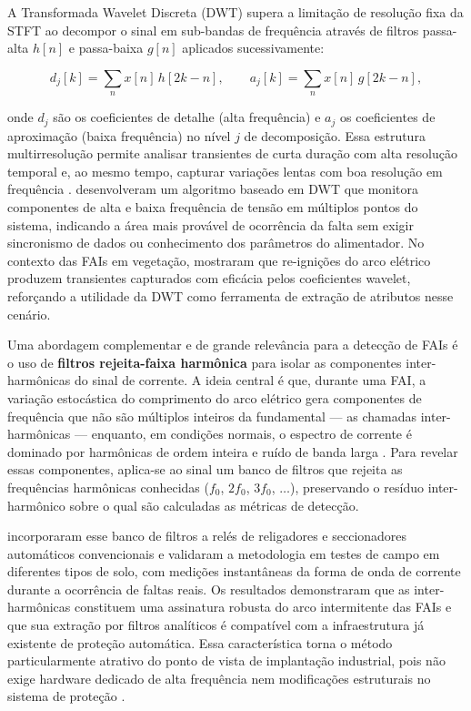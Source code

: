 A Transformada Wavelet Discreta (DWT) supera a limitação de resolução
fixa da STFT ao decompor o sinal em sub-bandas de frequência através de
filtros passa-alta $h[n]$ e passa-baixa $g[n]$ aplicados sucessivamente:

$$d_j[k] = \sum_{n} x[n]\, h[2k - n], \qquad a_j[k] = \sum_{n} x[n]\, g[2k - n],$$

onde $d_j$ são os coeficientes de detalhe (alta frequência) e $a_j$ os
coeficientes de aproximação (baixa frequência) no nível $j$ de
decomposição. Essa estrutura multirresolução permite analisar
transientes de curta duração com alta resolução temporal e, ao
mesmo tempo, capturar variações lentas com boa resolução em
frequência \cite{Elkalashy2007}.  desenvolveram um algoritmo
baseado em DWT que monitora componentes de alta e baixa frequência de tensão
em múltiplos pontos do sistema, indicando a área mais provável de
ocorrência da falta sem exigir sincronismo de dados ou conhecimento dos
parâmetros do alimentador. No contexto das FAIs em vegetação,
 mostraram que re-ignições do arco elétrico
produzem transientes capturados com eficácia pelos coeficientes wavelet,
reforçando a utilidade da DWT como ferramenta de extração de atributos
nesse cenário.

Uma abordagem complementar e de grande relevância para a detecção de FAIs é o
uso de \textbf{filtros rejeita-faixa harmônica} para isolar as componentes
inter-harmônicas do sinal de corrente. A ideia central é que, durante uma FAI,
a variação estocástica do comprimento do arco elétrico gera componentes de
frequência que não são múltiplos inteiros da fundamental --- as chamadas
inter-harmônicas --- enquanto, em condições normais, o espectro de corrente é
dominado por harmônicas de ordem inteira e ruído de banda larga
\cite{Macedo2015}. Para revelar essas componentes, aplica-se ao sinal um banco
de filtros que rejeita as frequências harmônicas conhecidas
($f_0$, $2f_0$, $3f_0$, $\ldots$), preservando o resíduo inter-harmônico sobre
o qual são calculadas as métricas de detecção.

 incorporaram esse banco de filtros a relés de
religadores e seccionadores automáticos convencionais e validaram a metodologia
em testes de campo em diferentes tipos de solo, com medições instantâneas da
forma de onda de corrente durante a ocorrência de faltas reais. Os resultados
demonstraram que as inter-harmônicas constituem uma assinatura robusta do arco
intermitente das FAIs e que sua extração por filtros analíticos é compatível
com a infraestrutura já existente de proteção automática. Essa característica
torna o método particularmente atrativo do ponto de vista de implantação
industrial, pois não exige hardware dedicado de alta frequência nem
modificações estruturais no sistema de proteção \cite{Macedo2015}.

